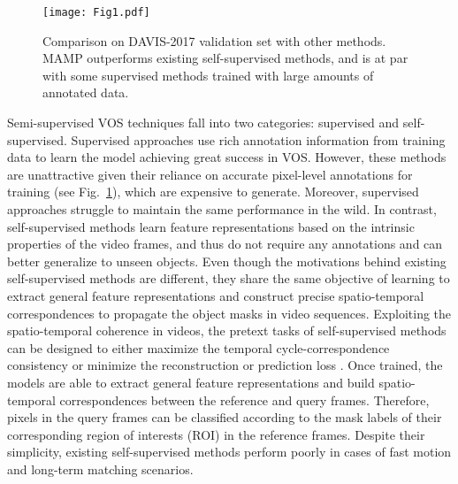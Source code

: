 \documentclass[letterpaper]{article} \usepackage{aaai22}  \usepackage{times}  \usepackage{helvet}  \usepackage{courier}  \usepackage[hyphens]{url}  \usepackage{graphicx} \urlstyle{rm} \def\UrlFont{\rm}  \usepackage{natbib}  \usepackage{caption} \DeclareCaptionStyle{ruled}{labelfont=normalfont,labelsep=colon,strut=off} \frenchspacing  \setlength{\pdfpagewidth}{8.5in}  \setlength{\pdfpageheight}{11in}  \usepackage{algorithm}
\begin{document}
\begin{figure}[t!]
\centering
\texttt{[image: Fig1.pdf]}
\caption{Comparison on DAVIS-2017 validation set with other methods. MAMP outperforms existing self-supervised methods, and is at par with some supervised methods trained with large amounts of annotated data.}
\label{fig:1}
\end{figure}

Semi-supervised VOS techniques fall into two categories: supervised and self-supervised. Supervised approaches \cite{STM,CFBI} use rich annotation information from training data to learn the model achieving great success in VOS. However, these methods are unattractive given their reliance on accurate pixel-level annotations for training (see Fig.~\ref{fig:1}), which are expensive to generate. Moreover, supervised approaches  struggle to maintain the same performance in the wild. In contrast, self-supervised methods \cite{MuG,MAST} learn feature representations based on the intrinsic properties of the video frames, and thus do not require any annotations and can better generalize to unseen objects. Even though the motivations behind existing self-supervised methods are different, they share the same objective of learning to extract general feature representations and construct precise spatio-temporal correspondences to propagate the object masks in video sequences. Exploiting the spatio-temporal coherence in videos, the pretext tasks of self-supervised methods can be designed to either maximize the temporal cycle-correspondence consistency \cite{MuG} or minimize the reconstruction or prediction loss \cite{MAST}. Once trained, the models are able to extract general feature representations and build spatio-temporal correspondences between the reference and query frames. Therefore, pixels in the query frames can be classified according to the mask labels of their corresponding region of interests (ROI) in the reference frames. Despite their simplicity, existing self-supervised methods perform poorly in cases of fast motion and long-term matching scenarios.
\end{document}
